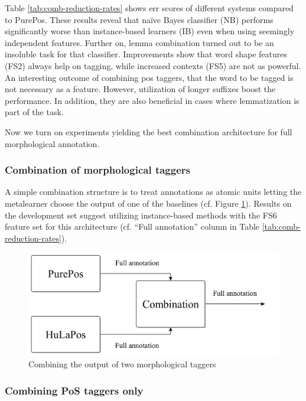Table \ref{tab:comb-reduction-rates} shows \acrlong{err} scores of different systems compared to PurePos. 
These results reveal that naïve Bayes classifier (NB) performs significantly worse than instance-based learners (IB) even when using seemingly independent features.
Further on, lemma combination turned out to be an insoluble task for that classifier.
Improvements show that word shape features (FS2) always help on tagging, while increased contexts (FS5) are not as powerful.
An interesting outcome of combining \acrshort{pos} taggers, that the word to be tagged is not necessary as a feature.
However, utilization of longer suffixes boost the performance.
In addition, they are also beneficial in cases where lemmatization is part of the task. 

Now we turn on experiments yielding the best combination architecture for full morphological annotation.

\subsubsection{Combination of morphological taggers}

A simple combination structure is to treat annotations as atomic units letting the metalearner choose the output of one of the baselines (cf. Figure \ref{fig:comb1}).
Results on the development set suggest utilizing instance-based methods with the FS6 feature set for this architecture (cf. ``Full annotation'' column in Table \ref{tab:comb-reduction-rates}). 

\begin{figure}[H]
  \centering
  \includegraphics[scale=0.2]{MorphTagging/comb1.png} 
  \caption{Combining the output of two morphological taggers}
  \label{fig:comb1}
\end{figure}

\subsubsection{Combining PoS taggers only}

